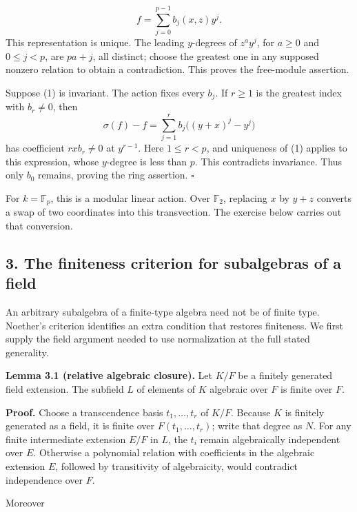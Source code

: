 \documentclass[
]{article}
\begin{document}
\[
f=\sum_{j=0}^{p-1} b_j(x,z)y^j.
\tag{1}
\] This representation is unique. The leading \(y\)-degrees of
\(z^a y^j\), for \(a\geq0\) and \(0\leq j<p\), are \(pa+j\), all
distinct; choose the greatest one in any supposed nonzero relation to
obtain a contradiction. This proves the free-module assertion.

Suppose (1) is invariant. The action fixes every \(b_j\). If \(r\geq1\)
is the greatest index with \(b_r\ne0\), then \[
\sigma(f)-f=\sum_{j=1}^r b_j\bigl((y+x)^j-y^j\bigr)
\] has coefficient \(rxb_r\ne0\) at \(y^{r-1}\). Here \(1\leq r<p\), and
uniqueness of (1) applies to this expression, whose \(y\)-degree is less
than \(p\). This contradicts invariance. Thus only \(b_0\) remains,
proving the ring assertion. \(\square\)

For \(k=\mathbb F_p\), this is a modular linear action. Over
\(\mathbb F_2\), replacing \(x\) by \(y+z\) converts a swap of two
coordinates into this transvection. The exercise below carries out that
conversion.

\subsection{3. The finiteness criterion for subalgebras of a
field}\label{the-finiteness-criterion-for-subalgebras-of-a-field}

An arbitrary subalgebra of a finite-type algebra need not be of finite
type. Noether's criterion identifies an extra condition that restores
finiteness. We first supply the field argument needed to use
normalization at the full stated generality.

\protect{}\label{lemma-3-1}{}

\textbf{Lemma 3.1 (relative algebraic closure).} Let \(K/F\) be a
finitely generated field extension. The subfield \(L\) of elements of
\(K\) algebraic over \(F\) is finite over \(F\).

\textbf{Proof.} Choose a transcendence basis \(t_1,\ldots,t_r\) of
\(K/F\). Because \(K\) is finitely generated as a field, it is finite
over \(F(t_1,\ldots,t_r)\); write that degree as \(N\). For any finite
intermediate extension \(E/F\) in \(L\), the \(t_i\) remain
algebraically independent over \(E\). Otherwise a polynomial relation
with coefficients in the algebraic extension \(E\), followed by
transitivity of algebraicity, would contradict independence over \(F\).

Moreover \protect{}\label{equation-2}{}
\end{document}
